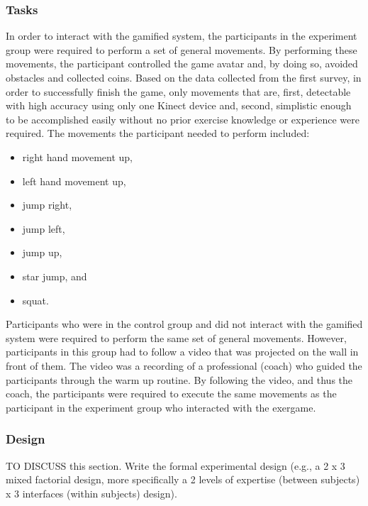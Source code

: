 \subsubsection{Tasks}
In order to interact with the gamified system, the participants in the experiment group were required to perform a set of general movements. By performing these movements, the participant controlled the game avatar and, by doing so, avoided obstacles and collected coins. Based on the data collected from the first survey, in order to successfully finish the game, only movements that are, first, detectable with high accuracy using only one Kinect device and, second, simplistic enough to be accomplished easily without no prior exercise knowledge or experience were required. The movements the participant needed to perform included: 
\begin{itemize}
\item right hand movement up,
\item left hand movement up,
\item jump right,
\item jump left,
\item jump up, 
\item star jump, and
\item squat.
\end{itemize}
Participants who were in the control group and did not interact with the gamified system were required to perform the same set of general movements. However, participants in this group had to follow a video that was projected on the wall in front of them. The video was a recording of a professional (coach) who guided the participants through the warm up routine. By following the video, and thus the coach, the participants were required to execute the same movements as the participant in the experiment group who interacted with the exergame.
\subsubsection{Design}
TO DISCUSS this section. Write the formal experimental design (e.g., a 2 x 3 mixed factorial design, more specifically a 2 levels of expertise (between subjects) x 3 interfaces (within subjects) design). 
